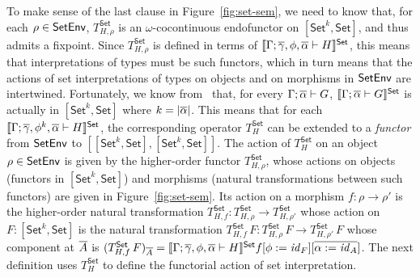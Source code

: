 \documentclass[runningheads]{llncs}
\newcommand{\set}{\mathsf{Set}}
\renewcommand{\id}{\mathit{id}}
\renewcommand{\id}{\mathit{id}}
\begin{document}
To make sense of the last clause in Figure~\ref{fig:set-sem}, we need
to know that, for each $\rho \in \mathsf{SetEnv}$, $T^\set_{H,\rho}$ is an
$\omega$-cocontinuous endofunctor on $[\set^k, \set]$, and thus admits
a fixpoint.  Since $T_{H,\rho}^\set$ is defined in terms of
$\setsem{\Gamma;\ol\gamma,\phi, \ol{\alpha} \vdash H}$, this means
that interpretations of types must be such functors, which in turn
means that the actions of set interpretations of types on objects and
on morphisms in $\mathsf{SetEnv}$ are intertwined. Fortunately, we know
from~\cite{jp19} that, for every $\Gamma; \overline{\alpha} \vdash G$,
$\setsem{\Gamma; \ol{\alpha} \vdash G}$ is actually in $[\set^k,\set]$
where $k = |\overline{\alpha}|$. This means that for each $\setsem{\Gamma;
  \ol\gamma, \phi^k, \ol{\alpha} \vdash H}$, the corresponding
operator $T^\set_{H}$ can be extended to a {\em functor} from
$\mathsf{SetEnv}$ to $[[\set^k,\set],[\set^k,\set]]$. The action of $T^\set_H$
on an object $\rho \in \mathsf{SetEnv}$ is given by the higher-order functor
$T_{H,\rho}^\set$, whose actions on objects (functors in $[\set^k,
  \set]$) and morphisms (natural transformations between such
functors) are given in Figure~\ref{fig:set-sem}. Its action on a
morphism $f : \rho \to \rho'$ is the higher-order natural
transformation $T^\set_{H,f} : T^\set_{H,\rho} \to T^\set_{H,\rho'}$
whose action on $F : [\set^k,\set]$ is the natural transformation
$T^\set_{H,f}\, F : T^\set_{H,\rho}\,F \to T^\set_{H,\rho'}\,F$ whose
component at $\overline{A}$ is $(T^\set_{H,f}\, F)_{\ol{A}} =
\setsem{\Gamma; \ol\gamma,\phi,\ol{\alpha} \vdash H}f[\phi :=
  \id_F][\ol{\alpha := \id_A}]$. The next definition uses 
$T^\set_H$ to define the functorial action of set interpretation.
\end{document}
